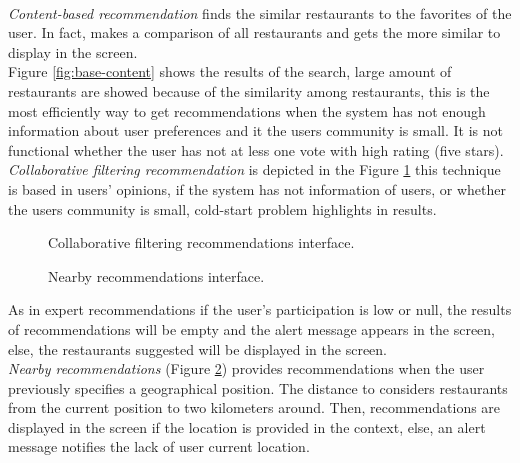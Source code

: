 \\ \textit{Content-based recommendation} finds the similar restaurants to the
favorites of the user. In fact, makes a comparison of all restaurants
and gets the more similar to display in the screen. \\
Figure \ref{fig:base-content}  
shows the results of the search, large amount of restaurants are showed
because of the similarity among restaurants, this is the most
efficiently way to get recommendations when the system has not enough
information about user preferences and it the users community is
small. It is not functional whether the user has not at less one vote
with high rating (five stars).\\
\textit{Collaborative filtering recommendation} is depicted in the 
Figure  \ref{fig:cf-recs}
this technique is based in users' opinions, if the system has not
information of users, or whether the users community is small, 
cold-start problem highlights in results. 
\begin{figure}
\captionsetup{font=footnotesize}
\centering
{}
\caption{Collaborative filtering recommendations interface.}
\label{fig:cf-recs}   
\end{figure}
\begin{figure}
\captionsetup{font=footnotesize}
\centering
{}
\caption{Nearby recommendations interface.}
\label{fig:nearby-recs}   
\end{figure}

As in expert  recommendations if the user's participation 
is low or null, the results of recommendations will be empty 
and the alert message appears in the
screen, else, the restaurants suggested will be displayed 
in the screen.\\
\textit{Nearby recommendations} (Figure \ref{fig:nearby-recs}) 
provides recommendations when the
user previously specifies a geographical position. The distance to
considers restaurants from the current position to two kilometers
around. Then, recommendations are displayed in the screen if the
location is provided in the context, else, an alert message  notifies
the lack of user current location.

